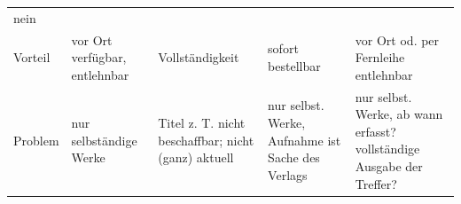 \documentclass[]{book}
\theoremstyle{definition}
\theoremstyle{definition}
\theoremstyle{definition}
\theoremstyle{remark}
\begin{document}
\begin{longtable}[]{@{}lllll@{}}
\begin{minipage}[t]{0.18\columnwidth}
nein \vspace{5mm}\strut
\end{minipage}\tabularnewline
\begin{minipage}[t]{0.21\columnwidth}\raggedright\strut
Vorteil \vspace{5mm}\strut
\end{minipage} & \begin{minipage}[t]{0.18\columnwidth}\raggedright\strut
vor Ort verfügbar, entlehnbar \vspace{5mm}\strut
\end{minipage} & \begin{minipage}[t]{0.16\columnwidth}\raggedright\strut
Vollständigkeit \vspace{5mm}\strut
\end{minipage} & \begin{minipage}[t]{0.14\columnwidth}\raggedright\strut
sofort bestellbar \vspace{5mm}\strut
\end{minipage} & \begin{minipage}[t]{0.18\columnwidth}\raggedright\strut
vor Ort od. per Fernleihe entlehnbar \vspace{5mm}\strut
\end{minipage}\tabularnewline
\begin{minipage}[t]{0.21\columnwidth}\raggedright\strut
Problem \vspace{5mm}\strut
\end{minipage} & \begin{minipage}[t]{0.18\columnwidth}\raggedright\strut
nur selbständige Werke \vspace{5mm}\strut
\end{minipage} & \begin{minipage}[t]{0.16\columnwidth}\raggedright\strut
Titel z. T. nicht beschaffbar; nicht (ganz) aktuell \vspace{5mm}\strut
\end{minipage} & \begin{minipage}[t]{0.14\columnwidth}\raggedright\strut
nur selbst. Werke, Aufnahme ist Sache des Verlags \vspace{5mm}\strut
\end{minipage} & \begin{minipage}[t]{0.18\columnwidth}\raggedright\strut
nur selbst. Werke, ab wann erfasst? vollständige Ausgabe der Treffer?
\vspace{5mm}\strut
\end{minipage}\tabularnewline
\bottomrule
\end{longtable}
\end{document}
